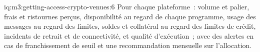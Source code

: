 \begin{solution}{iq:m3:getting-access-crypto-venues:6}
Pour chaque plateforme~: volume et palier, frais et ristournes perçus, disponibilité au regard de chaque programme, usage des messages au regard des limites, soldes et collatéral
au regard des limites de crédit, incidents de retrait et de connectivité, et qualité d'exécution~; avec des alertes en cas de franchissement de seuil et une recommandation mensuelle sur
l'allocation.
\end{solution}
